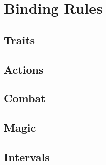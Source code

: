 \documentclass[a4paper,openany]{book}
\date{\today}
\begin{document}
\frontmatter

\section*{Binding Rules}

\physicalSkillChart

\mentalSkillChart

\begin{multicols}{2}

\subsection*{Traits}











\subsection*{Actions}






\subsection*{Combat}





\commonWeaponsChart



\commonArmourChart



\subsection*{Magic}



\subsection*{Intervals}



\end{multicols}
\end{document}
